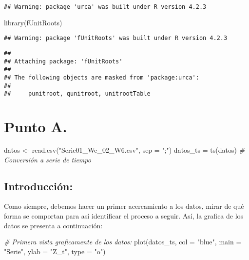 \documentclass[
]{article}
\newenvironment{Shaded}{\begin{snugshade}}{\end{snugshade}}
\newcommand{\AttributeTok}[1]{\textcolor[rgb]{0.77,0.63,0.00}{#1}}
\newcommand{\CommentTok}[1]{\textcolor[rgb]{0.56,0.35,0.01}{\textit{#1}}}
\newcommand{\FunctionTok}[1]{\textcolor[rgb]{0.00,0.00,0.00}{#1}}
\newcommand{\NormalTok}[1]{#1}
\newcommand{\OtherTok}[1]{\textcolor[rgb]{0.56,0.35,0.01}{#1}}
\newcommand{\StringTok}[1]{\textcolor[rgb]{0.31,0.60,0.02}{#1}}
\begin{document}
\begin{verbatim}
## Warning: package 'urca' was built under R version 4.2.3
\end{verbatim}

\begin{Shaded}
\begin{Highlighting}[]
\FunctionTok{library}\NormalTok{(fUnitRoots)}
\end{Highlighting}
\end{Shaded}

\begin{verbatim}
## Warning: package 'fUnitRoots' was built under R version 4.2.3
\end{verbatim}

\begin{verbatim}
## 
## Attaching package: 'fUnitRoots'
## 
## The following objects are masked from 'package:urca':
## 
##     punitroot, qunitroot, unitrootTable
\end{verbatim}

\hypertarget{punto-a.}{%
\section{Punto A.}\label{punto-a.}}

\begin{Shaded}
\begin{Highlighting}[]
\NormalTok{datos }\OtherTok{\textless{}{-}} \FunctionTok{read.csv}\NormalTok{(}\StringTok{"Serie01\_We\_02\_W6.csv"}\NormalTok{, }\AttributeTok{sep =} \StringTok{";"}\NormalTok{)}
\NormalTok{datos\_ts }\OtherTok{=} \FunctionTok{ts}\NormalTok{(datos) }\CommentTok{\# Conversión a serie de tiempo}
\end{Highlighting}
\end{Shaded}

\hypertarget{introducciuxf3n}{%
\subsection{Introducción:}\label{introducciuxf3n}}

Como siempre, debemos hacer un primer acercamiento a los datos, mirar de
qué forma se comportan para así identificar el proceso a seguir. Así, la
grafica de los datos se presenta a continuación:

\begin{Shaded}
\begin{Highlighting}[]
\CommentTok{\# Primera vista graficamente de los datos: }
\FunctionTok{plot}\NormalTok{(datos\_ts, }\AttributeTok{col =} \StringTok{"blue"}\NormalTok{, }\AttributeTok{main =} \StringTok{"Serie"}\NormalTok{, }\AttributeTok{ylab =} \StringTok{"Z\_t"}\NormalTok{, }\AttributeTok{type =} \StringTok{"o"}\NormalTok{)}
\end{Highlighting}
\end{Shaded}
\end{document}
